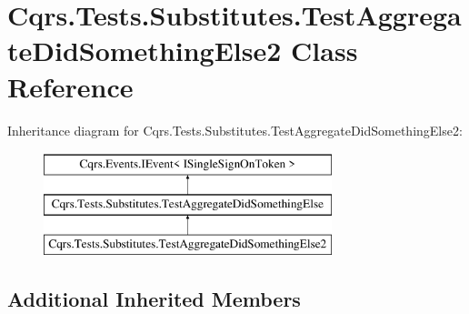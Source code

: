 \hypertarget{classCqrs_1_1Tests_1_1Substitutes_1_1TestAggregateDidSomethingElse2}{}\section{Cqrs.\+Tests.\+Substitutes.\+Test\+Aggregate\+Did\+Something\+Else2 Class Reference}
\label{classCqrs_1_1Tests_1_1Substitutes_1_1TestAggregateDidSomethingElse2}
Inheritance diagram for Cqrs.\+Tests.\+Substitutes.\+Test\+Aggregate\+Did\+Something\+Else2\+:\begin{figure}[H]
\begin{center}
\leavevmode
\includegraphics[height=3.000000cm]{classCqrs_1_1Tests_1_1Substitutes_1_1TestAggregateDidSomethingElse2}
\end{center}
\end{figure}
\subsection*{Additional Inherited Members}
